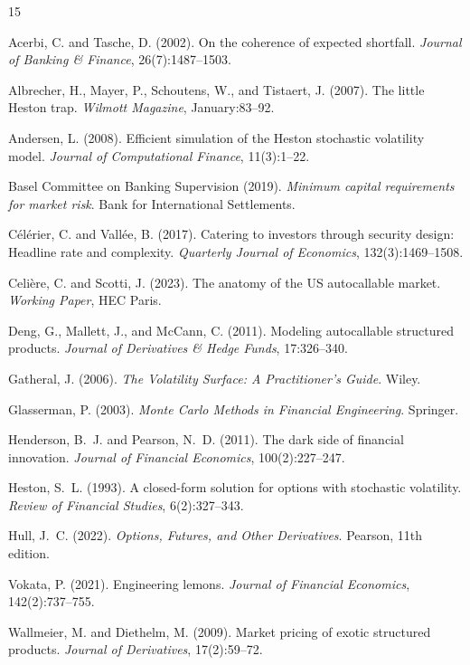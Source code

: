 \documentclass[12pt,a4paper]{article}
\begin{document}
\newpage

\begin{thebibliography}{15}

 Acerbi, C. and Tasche, D. (2002). On the coherence of expected shortfall. \textit{Journal of Banking \& Finance}, 26(7):1487--1503.

 Albrecher, H., Mayer, P., Schoutens, W., and Tistaert, J. (2007). The little Heston trap. \textit{Wilmott Magazine}, January:83--92.

 Andersen, L. (2008). Efficient simulation of the Heston stochastic volatility model. \textit{Journal of Computational Finance}, 11(3):1--22.

 Basel Committee on Banking Supervision (2019). \textit{Minimum capital requirements for market risk}. Bank for International Settlements.

 C\'{e}l\'{e}rier, C. and Vall\'{e}e, B. (2017). Catering to investors through security design: Headline rate and complexity. \textit{Quarterly Journal of Economics}, 132(3):1469--1508.

 Celi\`{e}re, C. and Scotti, J. (2023). The anatomy of the US autocallable market. \textit{Working Paper}, HEC Paris.

 Deng, G., Mallett, J., and McCann, C. (2011). Modeling autocallable structured products. \textit{Journal of Derivatives \& Hedge Funds}, 17:326--340.

 Gatheral, J. (2006). \textit{The Volatility Surface: A Practitioner's Guide}. Wiley.

 Glasserman, P. (2003). \textit{Monte Carlo Methods in Financial Engineering}. Springer.

 Henderson, B.~J. and Pearson, N.~D. (2011). The dark side of financial innovation. \textit{Journal of Financial Economics}, 100(2):227--247.

 Heston, S.~L. (1993). A closed-form solution for options with stochastic volatility. \textit{Review of Financial Studies}, 6(2):327--343.

 Hull, J.~C. (2022). \textit{Options, Futures, and Other Derivatives}. Pearson, 11th edition.

 Vokata, P. (2021). Engineering lemons. \textit{Journal of Financial Economics}, 142(2):737--755.

 Wallmeier, M. and Diethelm, M. (2009). Market pricing of exotic structured products. \textit{Journal of Derivatives}, 17(2):59--72.

\end{thebibliography}
\end{document}
